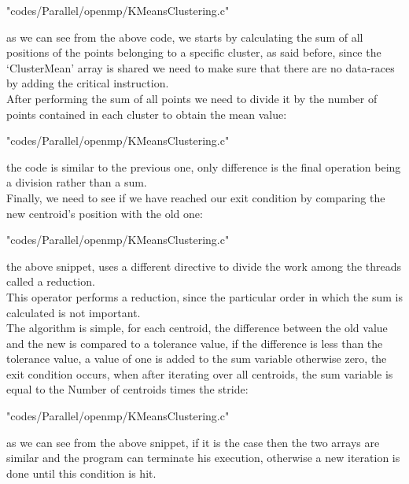 \documentclass[10pt,twocolumn,letterpaper]{article}
\begin{document}
\begin{lstinputlisting}[language=C,style=CSnippetStyle,caption=OpenMP Mean Calculation I,firstline=63,lastline=70]
					   {"codes/Parallel/openmp/KMeansClustering.c"}
\end{lstinputlisting}
as we can see from the above code, we starts by calculating the sum of all positions of the points belonging to a specific 
cluster, as said before, since the `ClusterMean' array is shared we need to make sure that there are no data-races by adding 
the critical instruction.\\
After performing the sum of all points we need to divide it by the number of points contained in each cluster to obtain the 
mean value:\\
\begin{lstinputlisting}[language=C,style=CSnippetStyle,caption=OpenMP Mean Calculation II,firstline=72,lastline=81]
					   {"codes/Parallel/openmp/KMeansClustering.c"}
\end{lstinputlisting}
the code is similar to the previous one, only difference is the final operation being a division rather than a sum.\\
Finally, we need to see if we have reached our exit condition by comparing the new centroid's position with the old one:\\
\begin{lstinputlisting}[language=C,style=CSnippetStyle,caption=OpenMP Centroid's Position Comparison,firstline=83,lastline=94]
					   {"codes/Parallel/openmp/KMeansClustering.c"}
\end{lstinputlisting}
the above snippet, uses a different directive to divide the work among the threads called a reduction.\\
This operator performs a reduction, since the particular order in which the sum is calculated is not important.\\
The algorithm is simple, for each centroid, the difference between the old value and the new is compared to a tolerance value,
if the difference is less than the tolerance value, a value of one is added to the sum variable otherwise zero, the exit 
condition occurs, when after iterating over all centroids, the sum variable is equal to the Number of centroids times the 
stride:\\
\begin{lstinputlisting}[language=C,style=CSnippetStyle,caption=OpenMP Exit Condition,firstline=95,lastline=97]
					   {"codes/Parallel/openmp/KMeansClustering.c"}
\end{lstinputlisting}
as we can see from the above snippet, if it is the case then the two arrays are similar and the program can terminate his 
execution, otherwise a new iteration is done until this condition is hit.\\
\end{document}
